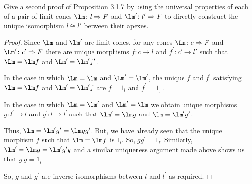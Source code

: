 \documentclass[../../main]{subfiles}
\begin{document}
\paragraph{}
\begin{exercise}
	Give a second proof of Proposition 3.1.7 by using the universal properties
	of each of a pair of limit cones $ \lm \colon l \Rightarrow F $ and $
	\lm' \colon l' \Rightarrow F $ to directly construct the unique
	isomorphism $ l \cong l' $ between their apexes.
\end{exercise}

\begin{proof}
Since $ \lm $ and $ \lm' $ are limit cones, for any cones $
\Lm\colon c\Rightarrow F $ and  $ \Lm'\colon c^\prime\Rightarrow F $ there are
unique morphisms $ f \colon c\rightarrow l $ and $ f^\prime \colon c'
\rightarrow l' $ such that $\Lm =\lm f$ and $\Lm^\prime
=\lm^\prime f^\prime$.

In the case in which $\Lm=\lm$ and $\Lm^\prime =\lm^\prime$, the
unique $f$ and $f^\prime$ satisfying $\lm=\lm f$ and $\lm^\prime
=\lm^\prime f$ are $f=1_l$ and $f^\prime =1_{l^\prime}$.

In the case in which $\Lm=\lm^\prime$ and $\Lm^\prime =\lm$ we
obtain unique morphisms $g\colon l^\prime\rightarrow l$ and $g^\prime\colon l\rightarrow
l^\prime$ such that $\lm^\prime =\lm g$ and $\lm =\lm^\prime
g^\prime$.

Thus, $\lm =\lm^\prime g^\prime =\lm gg^\prime$. But, we have
already seen that the unique morphism $f$ such that $\lm =\lm f$ is
$1_l$. So, $gg^\prime =1_l$. Similarly, $\lm^\prime =\lm
g=\lm^\prime g^\prime g$ and a similar uniqueness argument made above shows
us that $g^\prime g=1_{l^\prime}$.

So, $g$ and $g^\prime$ are inverse isomorphisms between $l$ and $l^\prime$ as
required.

\end{proof}
\end{document}
